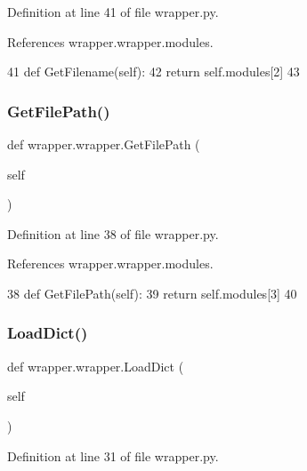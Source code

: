 Definition at line 41 of file wrapper.\+py.



References wrapper.\+wrapper.\+modules.


\begin{DoxyCode}
41     \textcolor{keyword}{def }GetFilename(self):
42         \textcolor{keywordflow}{return} self.modules[2]
43 
\end{DoxyCode}
\mbox{\label{classwrapper_1_1wrapper_a3c92a3d23586ea94e280359554b05baf}} 
\subsubsection{\texorpdfstring{Get\+File\+Path()}{GetFilePath()}}
{\footnotesize\ttfamily def wrapper.\+wrapper.\+Get\+File\+Path (\begin{DoxyParamCaption}\item[{}]{self }\end{DoxyParamCaption})}



Definition at line 38 of file wrapper.\+py.



References wrapper.\+wrapper.\+modules.


\begin{DoxyCode}
38     \textcolor{keyword}{def }GetFilePath(self):
39         \textcolor{keywordflow}{return} self.modules[3]
40 
\end{DoxyCode}
\mbox{\label{classwrapper_1_1wrapper_a5d047ef93e1fb3cdf75b4fb8266a0a8a}} 
\subsubsection{\texorpdfstring{Load\+Dict()}{LoadDict()}}
{\footnotesize\ttfamily def wrapper.\+wrapper.\+Load\+Dict (\begin{DoxyParamCaption}\item[{}]{self }\end{DoxyParamCaption})}



Definition at line 31 of file wrapper.\+py.




